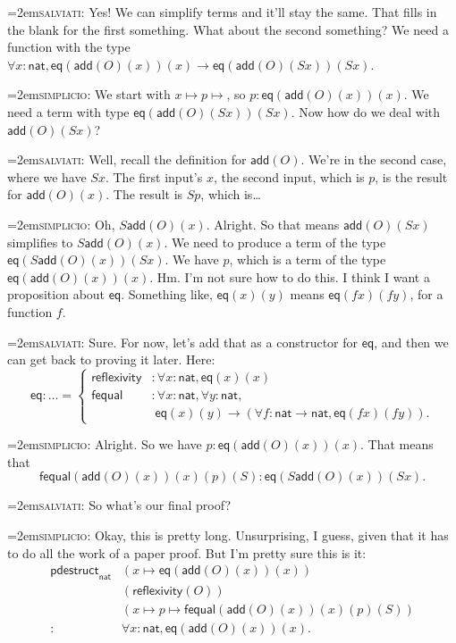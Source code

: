\documentclass[11pt,paper=letter]{scrartcl}
\renewcommand{\sf}{\mathsf}
\newcommand{\simp}{\vspace{0.5em}\noindent\hangindent=2em\textsc{simplicio:} }
\newcommand{\salv}{\vspace{0.5em}\noindent\hangindent=2em\textsc{salviati:} }
\begin{document}
\salv Yes! We can simplify terms and it'll stay the same. That fills in the blank for the first something. What about the second something? We need a function with the type $\forall x: \sf{nat}, \sf{eq}(\sf{add}(O)(x))(x) \to \sf{eq}(\sf{add}(O)(Sx))(Sx)$.

\simp We start with $x \mapsto p \mapsto$, so $p : \sf{eq}(\sf{add}(O)(x))(x)$. We need a term with type $\sf{eq}(\sf{add}(O)(Sx))(Sx)$. Now how do we deal with $\sf{add}(O)(Sx)$?

\salv Well, recall the definition for $\sf{add}(O)$. We're in the second case, where we have $Sx$. The first input's $x$, the second input, which is $p$, is the result for $\sf{add}(O)(x)$. The result is $Sp$, which is\dots

\simp Oh, $S\sf{add}(O)(x)$. Alright. So that means $\sf{add}(O)(Sx)$ simplifies to $S\sf{add}(O)(x)$. We need to produce a term of the type $\sf{eq}(S\sf{add}(O)(x))(Sx)$. We have $p$, which is a term of the type $\sf{eq}(\sf{add}(O)(x))(x)$. Hm. I'm not sure how to do this. I think I want a proposition about $\sf{eq}$. Something like, $\sf{eq}(x)(y)$ means $\sf{eq}(fx)(fy)$, for a function $f$.

\salv Sure. For now, let's add that as a constructor for $\sf{eq}$, and then we can get back to proving it later. Here: \[
\sf{eq}: \dots =
  \begin{cases}
  \sf{reflexivity}&: \forall x: \sf{nat}, \sf{eq}(x)(x)\\
  \sf{fequal}&: \forall x: \sf{nat}, \forall y: \sf{nat},\\
  &\;\sf{eq}(x)(y) \to (\forall f: \sf{nat} \to \sf{nat}, \sf{eq}(fx)(fy)).
  \end{cases}
\]

\simp Alright. So we have $p : \sf{eq}(\sf{add}(O)(x))(x)$. That means that \[
\sf{fequal}(\sf{add}(O)(x))(x)(p)(S) : \sf{eq}(S\sf{add}(O)(x))(Sx).\]

\salv So what's our final proof?

\simp Okay, this is pretty long. Unsurprising, I guess, given that it has to do all the work of a paper proof. But I'm pretty sure this is it:
\begin{align*}
  \sf{pdestruct}_\sf{nat}
  &(x \mapsto \sf{eq}(\sf{add}(O)(x))(x))\\
  &(\sf{reflexivity}(O))\\
  &(x \mapsto p \mapsto \sf{fequal}(\sf{add}(O)(x))(x)(p)(S))\\
  :\,& \forall x: \sf{nat}, \sf{eq}(\sf{add}(O)(x))(x).
\end{align*}
\end{document}
